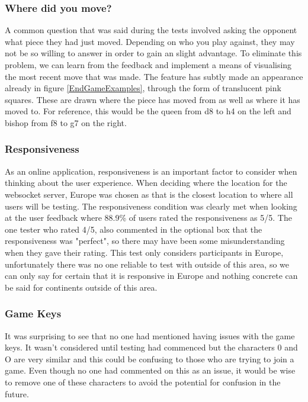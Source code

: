 \subsubsection{Where did you move?}

A common question that was said during the tests involved asking the opponent what piece they had just moved. Depending on who you play against, they may not be so willing to answer in order to gain an slight advantage. To eliminate this problem, we can learn from the feedback and implement a means of visualising the most recent move that was made. The feature has subtly made an appearance already in figure \ref{EndGameExamples}, through the form of translucent pink squares. These are drawn where the piece has moved from as well as where it has moved to. For reference, this would be the queen from d8 to h4 on the left and bishop from f8 to g7 on the right.

\subsubsection{Responsiveness}

As an online application, responsiveness is an important factor to consider when thinking about the user experience. When deciding where the location for the websocket server, Europe was chosen as that is the closest location to where all users will be testing. The responsiveness condition was clearly met when looking at the user feedback where 88.9\% of users rated the responsiveness as 5/5. The one tester who rated 4/5, also commented in the optional box that the responsiveness was "perfect", so there may have been some misunderstanding when they gave their rating. This test only considers participants in Europe, unfortunately there was no one reliable to test with outside of this area, so we can only say for certain that it is responsive in Europe and nothing concrete can be said for continents outside of this area.

\subsubsection{Game Keys}

It was surprising to see that no one had mentioned having issues with the game keys. It wasn't considered until testing had commenced but the characters 0 and O are very similar and this could be confusing to those who are trying to join a game. Even though no one had commented on this as an issue, it would be wise to remove one of these characters to avoid the potential for confusion in the future.

